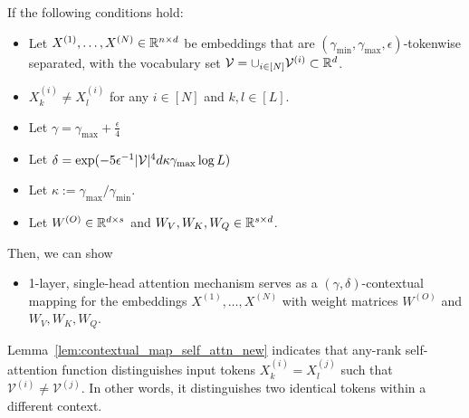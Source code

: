 \begin{lemma}
\label{lem:contextual_map_self_attn_new}

    If the following conditions hold:
    \begin{itemize}
        \item Let $X^{(1)}, \hdots, X^{(N)} \in \mathbb{R}^{n \times d}$ be embeddings that are $(\gamma_{\min}, \gamma_{\max}, \epsilon)$-tokenwise separated, with the vocabulary set $\mathcal{V} = \cup_{i \in [N]} \mathcal{V}^{(i)} \subset \mathbb{R}^{d}$.
        \item $X_k^{(i)} \neq X_l^{(i)}$ for any $i \in [N]$ and $k, l \in [L]$.
        \item Let $
        \gamma = \gamma_{\max} + \frac{\epsilon}{4}$
        \item Let $
        \delta = \exp(-5 \epsilon^{-1} |{\cal V}|^4 d \kappa \gamma_{\max} \log L )$
        \item Let $\kappa := \gamma_{\max}/\gamma_{\min}$.
        \item Let $W^{(O)} \in \mathbb{R}^{d \times s}$ and $W_V, W_K, W_Q \in \mathbb{R}^{s \times d}$.
    \end{itemize}

    Then, we can show
    \begin{itemize}
        \item 1-layer, single-head attention mechanism serves as a $(\gamma, \delta)$-contextual mapping for the embeddings $X^{(1)}, \hdots, X^{(N)}$ with weight matrices $W^{(O)}$ and $W_V, W_K, W_Q$. 
    \end{itemize}
    
\end{lemma}


Lemma~\ref{lem:contextual_map_self_attn_new} indicates that any-rank self-attention function distinguishes input tokens $X_k^{(i)}=X_l^{(j)}$ such that $\mathcal{V}^{(i)} \neq \mathcal{V}^{(j)}$.
In other words, 
it distinguishes two identical tokens within a different context.